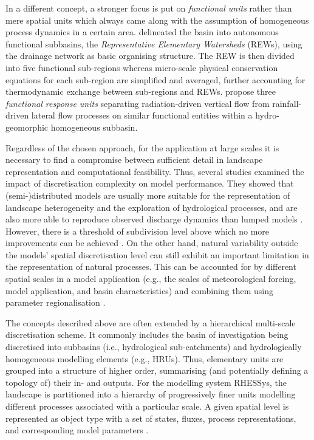 In a different concept, a stronger focus is put on \emph{functional units} rather than mere spatial units which always came along with the assumption of homogeneous process dynamics in a certain area.
\DIFaddbegin {}\DIFaddend \citet{Reggiani1998} delineated the basin into autonomous functional subbasins, the \emph{Representative Elementary Watersheds} (REWs), using the drainage network as basic organising structure.
The REW is then divided into five functional sub-regions whereas micro-scale physical conservation equations for each sub-region are simplified and averaged, further accounting for thermodynamic exchange between sub-regions and REWs.
\citet{Zehe2014} propose three \emph{functional response units} separating radiation-driven vertical flow from rainfall-driven lateral flow processes on similar functional entities within a hydro-geomorphic homogeneous subbasin.
\DIFaddbegin {}\DIFaddend 

Regardless of the chosen approach, for the application at large scales it is necessary to find a compromise between sufficient detail in landscape representation and computational feasibility.
Thus, several studies examined the impact of discretisation complexity on model performance.
They showed that (semi-)distributed models are usually more suitable for the representation of landscape heterogeneity and the exploration of hydrological processes, and are also more able to reproduce observed discharge dynamics than lumped models \citep{Kumar2010, Euser2015}.
However, there is a threshold of subdivision level above which no more improvements can be achieved \citep{Wood1988, Han2014a, Haghnegahdar2015}.
On the other hand, natural variability outside the models' spatial discretisation level can still exhibit an important limitation in the representation of natural processes.
This can be accounted for by different spatial scales in a model application (e.g., the scales of meteorological forcing, model application, and basin characteristics) and combining them using parameter regionalisation \citep[e.g.,][]{Samaniego2010}.

The concepts described above are often extended by a hierarchical multi-scale discretisation scheme.
It commonly includes the basin of investigation being discretised into subbasins (i.e., hydrological sub-catchments) and hydrologically homogeneous modelling elements (e.g., HRUs).
Thus, elementary units are grouped into a structure of higher order, summarising (and potentially defining a topology of) their in- and outputs.
For the modelling system RHESSys, \DIFaddbegin {}\DIFaddend the landscape is partitioned into a hierarchy of progressively finer units modelling different processes associated with a particular scale.
A given spatial level is represented as object type with a set of states, fluxes, process representations, and corresponding model parameters \citep{Band2000, Tague2004}.

